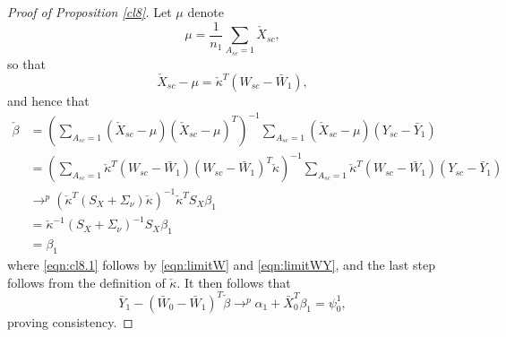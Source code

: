 \begin{proof}[Proof of Proposition \ref{cl8}]
Let $\mu$ denote 
\[ \mu = \frac{1}{n_1} \sum_{A_{sc} = 1} \check{X}_{sc},\]
so that
\[ \check{X}_{sc} - \mu = \check{\kappa}^T(W_{sc} - \bar{W}_1),\]
and hence that 
\begin{align}
 \nonumber \check{\beta} &=  \left(\sum_{A_{sc}=1} (\check{X}_{sc} - \mu)(\check{X}_{sc} - \mu)^T\right)^{-1} \sum_{A_{sc}=1} (\check{X}_{sc} - \mu)(Y_{sc} - \bar{Y}_1) \\
 \nonumber & = \left(\sum_{A_{sc}=1} \check{\kappa}^T (W_{sc} - \bar{W}_1)(W_{sc} - \bar{W}_1)^T \check{\kappa}\right)^{-1} \sum_{A_{sc}=1} \check{\kappa}^T(W_{sc} - \bar{W}_1)(Y_{sc} - \bar{Y}_1) \\
 & \to^p (\check{\kappa}^T (S_X + \Sigma_\nu) \check{\kappa})^{-1} \check{\kappa}^T S_X \beta_1  \label{eqn:cl8.1}\\
 \nonumber 
 & = \check{\kappa}^{-1} (S_X + \Sigma_{\nu})^{-1} S_X \beta_1 \\
 \nonumber 
 & = \beta_1
 \end{align}
 where \eqref{eqn:cl8.1} follows by \eqref{eqn:limitW} and \eqref{eqn:limitWY}, and the last step follows from the definition of $\check{\kappa}$. It then follows that 
 \[ \bar{Y}_1 - (\bar{W}_0 - \bar{W}_1)^T \check{\beta} \to^p \alpha_1 + \bar{X}_0^T \beta_1 = \psi_0^1,\]
 proving consistency.
    
\end{proof}

